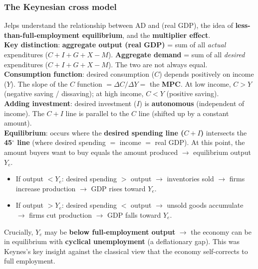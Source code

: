 \subsubsection*{The Keynesian cross model}
Jelps understand the relationship between AD and (real GDP), the idea of \textbf{less-than-full-employment equilibrium}, and the \textbf{multiplier effect}.
\\
\textbf{Key distinction}: \textbf{aggregate output (real GDP)} = sum of all \textit{actual} expenditures ($C + I + G + X - M$). \textbf{Aggregate demand} = sum of all \textit{desired} expenditures ($C + I + G + X - M$). The two are not always equal.
\\
\textbf{Consumption function}: desired consumption ($C$) depends positively on income ($Y$). The slope of the $C$ function $= \Delta C / \Delta Y =$ the \textbf{MPC}. At low income, $C > Y$ (negative saving / dissaving); at high income, $C < Y$ (positive saving).
\\
\textbf{Adding investment}: desired investment ($I$) is \textbf{autonomous} (independent of income). The $C + I$ line is parallel to the $C$ line (shifted up by a constant amount).
\\
\textbf{Equilibrium}: occurs where the \textbf{desired spending line ($C + I$)} intersects the \textbf{45$^\circ$ line} (where desired spending $=$ income $=$ real GDP). At this point, the amount buyers want to buy equals the amount produced $\to$ equilibrium output $Y_e$.
\begin{itemize}
  \item If output $< Y_e$: desired spending $>$ output $\to$ inventories sold $\to$ firms increase production $\to$ GDP rises toward $Y_e$.
  \item If output $> Y_e$: desired spending $<$ output $\to$ unsold goods accumulate $\to$ firms cut production $\to$ GDP falls toward $Y_e$.
\end{itemize}
Crucially, $Y_e$ may be \textbf{below full-employment output} $\to$ the economy can be in equilibrium with \textbf{cyclical unemployment} (a deflationary gap). This was Keynes's key insight against the classical view that the economy self-corrects to full employment.
\\
